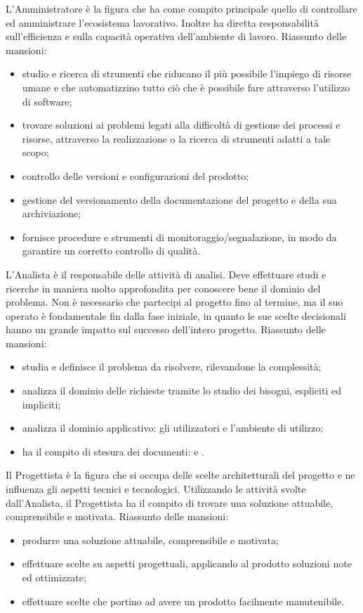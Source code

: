 			L'Amministratore è la figura che ha come compito principale quello di controllare ed amministrare l'ecosistema lavorativo. Inoltre ha diretta responsabilità sull'efficienza e sulla capacità operativa dell'ambiente di lavoro.
			Riassunto delle mansioni:
			\begin{itemize}
				\item studio e ricerca di strumenti che riducano il più possibile l'impiego di risorse umane e che automatizzino tutto ciò che è possibile fare attraverso l'utilizzo di software;
				\item trovare soluzioni ai problemi legati alla difficoltà di gestione dei processi e risorse, attraverso la realizzazione o la ricerca di strumenti adatti a tale scopo;
				\item controllo delle versioni e configurazioni del prodotto;
				\item gestione del versionamento della documentazione del progetto e della sua archiviazione;
				\item fornisce procedure e strumenti di monitoraggio/segnalazione, in modo da garantire un corretto controllo di qualità.
			\end{itemize}
		
			L'Analista è il responsabile delle attività di analisi. Deve effettuare studi e ricerche in maniera molto approfondita per conoscere bene il dominio del problema. Non è necessario che partecipi al progetto fino al termine, ma il suo operato è fondamentale fin dalla fase iniziale, in quanto le sue scelte decisionali hanno un grande impatto sul successo dell'intero progetto.
			Riassunto delle mansioni:
			\begin{itemize}
				\item studia e definisce il problema da risolvere, rilevandone la complessità;
				\item analizza il dominio delle richieste tramite lo studio dei bisogni, espliciti ed impliciti;
				\item analizza il dominio applicativo: gli utilizzatori e l'ambiente di utilizzo;
				\item ha il compito di stesura dei documenti: \AdR{} e \SdF{}.
			\end{itemize}
		
			Il Progettista è la figura che si occupa delle scelte architetturali del progetto e ne influenza gli aspetti tecnici e tecnologici. Utilizzando le attività svolte dall'Analista, il Progettista ha il compito di trovare una soluzione attuabile, comprensibile e motivata.
			Riassunto delle mansioni:
			\begin{itemize}
				\item produrre una soluzione attuabile, comprensibile e motivata;
				\item effettuare scelte su aspetti progettuali, applicando al prodotto soluzioni note ed ottimizzate;
				\item effettuare scelte che portino ad avere un prodotto facilmente manutenibile.
			\end{itemize}
		
